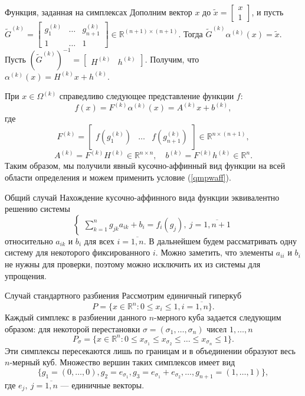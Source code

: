 \documentclass[envcountsect]{beamer}
\theoremstyle{definition}
\begin{document}
	\begin{frame}{Функция, заданная на симплексах}
		Дополним вектор \(x\) до  \(\tilde{x} = \begin{bmatrix} x \\ 1 \end{bmatrix}\), и пусть \(\tilde{G}^{(k)} = \begin{bmatrix} g^{(k)}_{1} & \dots & g^{(k)}_{n+1} \\ 1 & \dots & 1 \end{bmatrix} \in \mathbb{R}^{(n + 1) \times (n + 1)}\). Тогда \(\tilde{G}^{(k)} \alpha^{(k)}(x) = \tilde x\). Пусть \((\tilde{G}^{(k)})^{-1} = \begin{bmatrix} H^{(k)} & h^{(k)} \end{bmatrix}\). Получим, что \(\alpha^{(k)}(x) = H^{(k)} x + h^{(k)} \).
		
		При \(x \in \Omega^{(k)}\) справедливо следующее представление функции \(f\):
		\[f(x) = F^{(k)}\alpha^{(k)}(x) = A^{(k)}x + b^{(k)},\]
		где \[F^{(k)} = \begin{bmatrix} f(g^{(k)}_{1}) & \dots & f(g^{(k)}_{n+1}) \end{bmatrix} \in \mathbb{R}^{n\times(n+1)},\]
		\[A^{(k)} = F^{(k)}H^{(k)} \in \mathbb{R}^{n\times n},\quad b^{(k)} = F^{(k)}h^{(k)} \in \mathbb{R}^{n}.\]
		Таким образом, мы получили явный кусочно-аффинный вид функции на всей области определения и можем применить условие (\ref{qmpwaff}).
	\end{frame}
	\begin{frame}{Общий случай}
		Нахождение кусочно-аффинного вида функции эквивалентно решению системы
		\[
		\begin{cases}
			\sum_{k = 1}^{n}g_{jk}a_{ik} + b_i = f_i(g_j),\ j = \overline{1, n+1}
		\end{cases}
		\]
		относительно \(a_{ik}\) и \(b_i\) для всех \(i = \overline{1, n}\). В дальнейшем будем рассматривать одну систему для некоторого фиксированного \(i\). Можно заметить, что элементы \(a_{ii}\) и \(b_i\) не нужны для проверки, поэтому можно исключить их из системы для упрощения.
	\end{frame}

	\begin{frame}{Случай стандартного разбиения}
		Рассмотрим единичный гиперкуб
		\[
		P = \{x \in \mathbb R^n: 0 \le x_i \le 1, i = \overline{1, n}\}.
		\] 
		Каждый симплекс в разбиении данного \(n\)-мерного куба задается следующим образом: для некоторой перестановки \(\sigma = (\sigma_1, \dots, \sigma_n)\) чисел \(1,\dots,n\)
		\[P_\sigma = \{x \in \mathbb R^n: 0 \le x_{\sigma_1} \le x_{\sigma_2} \le \dots \le x_{\sigma_n} \le 1\}.\]
		Эти симплексы пересекаются лишь по границам и в объединении образуют весь \(n\)-мерный куб. Множество вершин таких симплексов имеет вид
		\[
		\{g_1 = (0,\dots,0), g_2 = e_{\sigma_1}, g_3 = e_{\sigma_1} + e_{\sigma_2}, \dots, g_{n+1} = (1,\dots,1)\},
		\]
		где \(e_j,\ j = \overline{1, n}\) --- единичные векторы.
	\end{frame}
	
\end{document}
